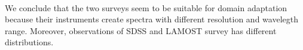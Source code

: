 \begin{figure}
\\
\caption[QSOs coverage of SDSS and LAMOST]{}
\label{qso_coverage}
\end{figure}

We conclude that the two surveys seem to be suitable for domain adaptation
because their instruments create spectra with different resolution and wavelegth range.
Moreover, observations of SDSS and LAMOST survey has different distributions.
